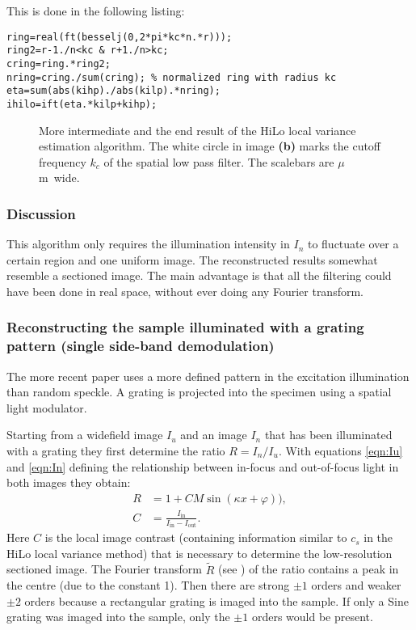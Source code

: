 This is done in the following listing:
\begin{lstlisting}
ring=real(ft(besselj(0,2*pi*kc*n.*r)));
ring2=r-1./n<kc & r+1./n>kc;
cring=ring.*ring2;
nring=cring./sum(cring); % normalized ring with radius kc
eta=sum(abs(kihp)./abs(kilp).*nring);
ihilo=ift(eta.*kilp+kihp);
\end{lstlisting}

\begin{figure}[htb]
  \centering
  \caption{More intermediate and the end result of the HiLo local
    variance estimation algorithm. The white circle in image {\bf (b)}
    marks the cutoff frequency $k_c$ of the spatial low pass
    filter. The scalebars are \unit[2]{$\mu$m} wide.}
  \label{fig:hilo1interm2}
\end{figure}

\subsubsection*{Discussion}
This algorithm only requires the illumination intensity in $I_n$ to
fluctuate over a certain region and one uniform image. The
reconstructed results somewhat resemble a sectioned image. The main
advantage is that all the filtering could have been done in real
space, without ever doing any Fourier transform.
\subsubsection{Reconstructing the sample illuminated with a grating
  pattern (single side-band demodulation)}
The more recent paper \cite{2009Santos} uses a more defined pattern in
the excitation illumination than random speckle. A grating is
projected into the specimen using a spatial light modulator.

Starting from a widefield image $I_u$ and an image $I_n$ that has been
illuminated with a grating they first determine the ratio $R=I_n/I_u$.
With equations \eqref{eqn:Iu} and \eqref{eqn:In} defining the
relationship between in-focus and out-of-focus light in both images
they obtain:
\begin{align}
  R&=1+CM\sin(\kappa x+\varphi)),\\
  C&=\frac{I_\textrm{in}}{I_\textrm{in}-I_\textrm{out}}.
\end{align}
Here $C$ is the local image contrast (containing information similar
to $c_s$ in the HiLo local variance method) that is necessary to
determine the low-resolution sectioned image. The Fourier transform
$\tilde R$ (see ) of the ratio contains a peak in the
centre (due to the constant 1). Then there are strong $\pm 1$ orders
and weaker $\pm 2$ orders because a rectangular grating is imaged into
the sample. If only a Sine grating was imaged into the sample, only the $\pm 1$ orders would be present.

